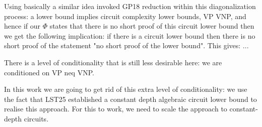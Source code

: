 \documentclass[11pt,letter]{article}
\theoremstyle{remark} %
\begin{document}
{{    Using basically a similar idea \cite{ST25} invoked  GP18 reduction within this diagonalization process: a lower bound implies circuit complexity lower bounds, VP VNP, and hence if our $\Phi$ states that there is no short proof of this circuit lower bound then we get the following implication: if there is a circuit lower bound then there is no short proof of the statement "no short proof of the lower bound". This gives: ...

    There is a level of conditionality that is still less desirable here: we are conditioned on VP neq VNP.
    
    In this work we are going to get rid of this extra level of conditionality: we use the fact that LST25 established a constant depth algebraic circuit lower bound to   realise this approach. For this to work, we need to scale the approach to constant-depth circuits.
} %












}
\end{document}
